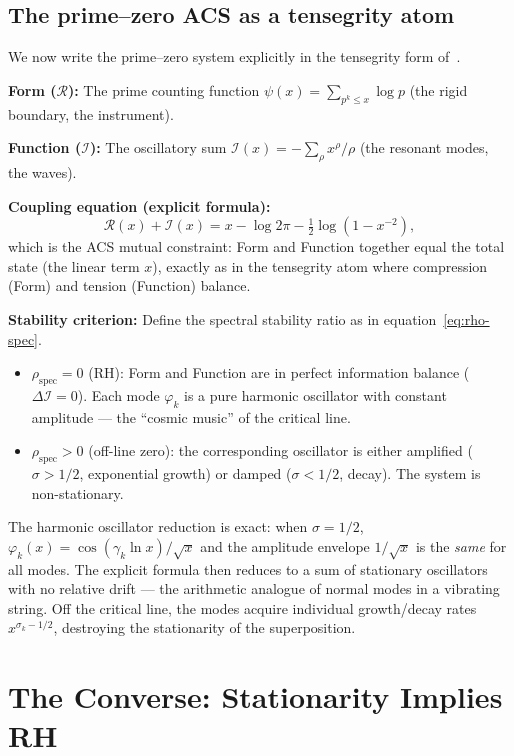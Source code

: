 \documentclass[11pt,a4paper]{article}
\theoremstyle{plain}
\theoremstyle{definition}
\theoremstyle{remark}
\newcommand{\DI}{\Delta\mathcal{I}}
\begin{document}
\subsection{The prime--zero ACS as a tensegrity atom}

We now write the prime--zero system explicitly in the tensegrity form
of~\cite{Wallace2026a}.

\medskip
\noindent\textbf{Form ($\mathcal{R}$):}
The prime counting function $\psi(x) = \sum_{p^k \leq x} \log p$
(the rigid boundary, the instrument).

\medskip
\noindent\textbf{Function ($\mathcal{I}$):}
The oscillatory sum $\mathcal{I}(x) = -\sum_\rho x^\rho/\rho$
(the resonant modes, the waves).

\medskip
\noindent\textbf{Coupling equation (explicit formula):}
\[
  \mathcal{R}(x) + \mathcal{I}(x) = x - \log 2\pi - \tfrac{1}{2}\log(1 - x^{-2}),
\]
which is the ACS mutual constraint: Form and Function together equal
the total state (the linear term $x$), exactly as in the tensegrity
atom where compression (Form) and tension (Function) balance.

\medskip
\noindent\textbf{Stability criterion:}
Define the spectral stability ratio as in equation~\eqref{eq:rho-spec}.
\begin{itemize}[noitemsep]
  \item $\rho_{\mathrm{spec}} = 0$ (RH): Form and Function are in perfect
    information balance ($\DI = 0$).  Each mode $\varphi_k$ is a pure
    harmonic oscillator with constant amplitude --- the
    ``cosmic music'' of the critical line.
  \item $\rho_{\mathrm{spec}} > 0$ (off-line zero): the corresponding
    oscillator is either amplified ($\sigma > 1/2$, exponential growth)
    or damped ($\sigma < 1/2$, decay).  The system is non-stationary.
\end{itemize}
The harmonic oscillator reduction is exact: when $\sigma = 1/2$,
$\varphi_k(x) = \cos(\gamma_k \ln x)/\sqrt{x}$ and the amplitude
envelope $1/\sqrt{x}$ is the \emph{same} for all modes.  The
explicit formula then reduces to a sum of stationary oscillators
with no relative drift --- the arithmetic analogue of normal modes
in a vibrating string.  Off the critical line, the modes acquire
individual growth/decay rates $x^{\sigma_k - 1/2}$, destroying the
stationarity of the superposition.

\section{The Converse: Stationarity Implies RH}
\label{sec:converse}
\end{document}
